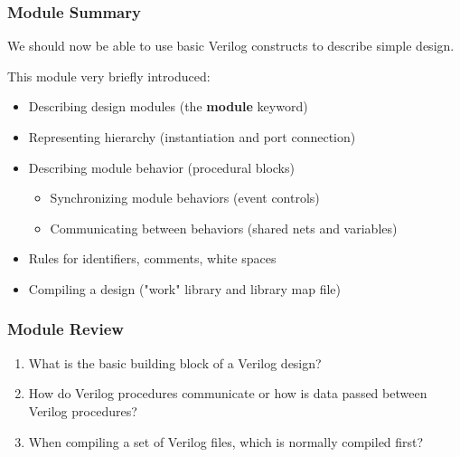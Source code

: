 \documentclass[t, notes]{beamer}
\begin{document}
\begin{frame}
\frametitle{Module Summary}

We should now be able to use basic Verilog constructs to describe simple design.

This module very briefly introduced:
\begin{itemize}
\item Describing design modules (the \textbf{module} keyword)
\item Representing hierarchy (instantiation and port connection)
\item Describing module behavior (procedural blocks)
\begin{itemize}
	\item Synchronizing module behaviors (event controls)
	\item Communicating between behaviors (shared nets and variables)
\end{itemize}
\item Rules for identifiers, comments, white spaces
\item Compiling a design ("work" library and library map file)
\end{itemize}
\end{frame}


\begin{frame}
\frametitle{Module Review}

\begin{enumerate}
\item What is the basic building block of a Verilog design?
\item How do Verilog procedures communicate or how is data passed between Verilog procedures?
\item When compiling a set of Verilog files, which is normally compiled first?
\end{enumerate}

\end{frame}
\end{document}
